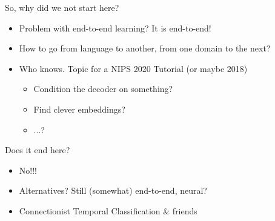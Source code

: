 \begin{frame}{So, why did we not start here?}
  \begin{itemize}
  \item Problem with end-to-end learning? It is end-to-end!
  \item How to go from language to another, from one domain to the next?
  \item Who knows. Topic for a NIPS 2020 Tutorial (or maybe 2018)
    \begin{itemize}
    \item Condition the decoder on something?
    \item Find clever embeddings?
    \item ...?
    \end{itemize}
  \end{itemize}
\end{frame}

\begin{frame}{Does it end here?}
  \begin{itemize}
  \item No!!!
  \item Alternatives? Still (somewhat) end-to-end, neural?
  \item Connectionist Temporal Classification \& friends
  \end{itemize}
\end{frame}

